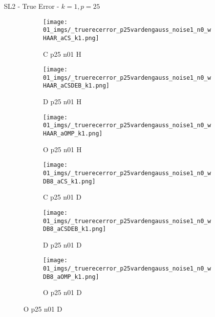 \begin{frame}{SL2 - True Error - $k=1,p=25$}{}
\begin{figure}
\begin{subfigure}{0.13\textwidth}
\texttt{[image: 01\_imgs/\_truerecerror\_p25vardengauss\_noise1\_n0\_wHAAR\_aCS\_k1.png]}
\caption*{\tiny C p25 n01 H}
\end{subfigure}
\begin{subfigure}{0.13\textwidth}
\texttt{[image: 01\_imgs/\_truerecerror\_p25vardengauss\_noise1\_n0\_wHAAR\_aCSDEB\_k1.png]}
\caption*{\tiny D p25 n01 H}
\end{subfigure}
\begin{subfigure}{0.13\textwidth}
\texttt{[image: 01\_imgs/\_truerecerror\_p25vardengauss\_noise1\_n0\_wHAAR\_aOMP\_k1.png]}
\caption*{\tiny O p25 n01 H}
\end{subfigure}
\begin{subfigure}{0.13\textwidth}
\texttt{[image: 01\_imgs/\_truerecerror\_p25vardengauss\_noise1\_n0\_wDB8\_aCS\_k1.png]}
\caption*{\tiny C p25 n01 D}
\end{subfigure}
\begin{subfigure}{0.13\textwidth}
\texttt{[image: 01\_imgs/\_truerecerror\_p25vardengauss\_noise1\_n0\_wDB8\_aCSDEB\_k1.png]}
\caption*{\tiny D p25 n01 D}
\end{subfigure}
\begin{subfigure}{0.13\textwidth}
\texttt{[image: 01\_imgs/\_truerecerror\_p25vardengauss\_noise1\_n0\_wDB8\_aOMP\_k1.png]}
\caption*{\tiny O p25 n01 D}
\end{subfigure}

\vspace{5pt}


\end{figure}
\end{frame}
